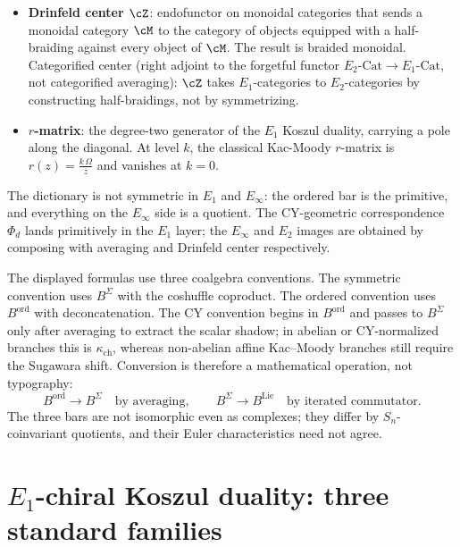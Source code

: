 \begin{itemize}
\item \textbf{Drinfeld center $\cZ$}: endofunctor on monoidal categories that sends a monoidal category $\cM$ to the category of objects equipped with a half-braiding against every object of $\cM$. The result is braided monoidal. Categorified center (right adjoint to the forgetful functor $E_2\text{-Cat} \to E_1\text{-Cat}$, not categorified averaging): $\cZ$ takes $E_1$-categories to $E_2$-categories by constructing half-braidings, not by symmetrizing.
\item \textbf{$r$-matrix}: the degree-two generator of the $E_1$ Koszul duality, carrying a pole along the diagonal. At level $k$, the classical Kac-Moody $r$-matrix is $r(z) = \frac{k\,\Omega}{z}$ and vanishes at $k=0$.
\end{itemize}

The dictionary is not symmetric in $E_1$ and $E_\infty$: the ordered bar is the primitive, and everything on the $E_\infty$ side is a quotient. The CY-geometric correspondence $\Phi_d$ lands primitively in the $E_1$ layer; the $E_\infty$ and $E_2$ images are obtained by composing with averaging and Drinfeld center respectively.

\begin{remark}
\label{rem:notation-consistency}
The displayed formulas use three coalgebra conventions. The symmetric convention uses $B^{\Sigma}$ with the coshuffle coproduct. The ordered convention uses $B^{\mathrm{ord}}$ with deconcatenation. The CY convention begins in $B^{\mathrm{ord}}$ and passes to $B^{\Sigma}$ only after averaging to extract the scalar shadow; in abelian or CY-normalized branches this is $\kappa_{\mathrm{ch}}$, whereas non-abelian affine Kac--Moody branches still require the Sugawara shift. Conversion is therefore a mathematical operation, not typography:
\[
 B^{\mathrm{ord}} \longrightarrow B^{\Sigma}
 \quad\text{by averaging},\qquad
 B^{\Sigma} \longrightarrow B^{\mathrm{Lie}}
 \quad\text{by iterated commutator}.
\]
The three bars are not isomorphic even as complexes; they differ by $S_n$-coinvariant quotients, and their Euler characteristics need not agree.
\end{remark}

\section{\texorpdfstring{$E_1$}{E-1}-chiral Koszul duality: three standard families}
\label{sec:e1-koszul-three-families}

